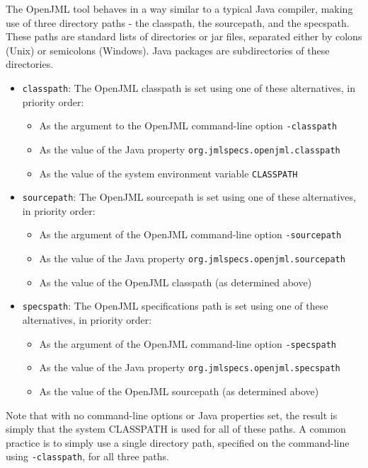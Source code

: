 The OpenJML tool behaves in a way similar to a typical Java compiler, 
making use of three directory paths - the classpath, the sourcepath, and the specspath.  
These paths are standard lists of directories or jar files, 
separated either by colons (Unix) or semicolons (Windows).  
Java packages are subdirectories of these directories.

\begin{itemize}[noitemsep,nolistsep]
\item \texttt{classpath}: The OpenJML classpath is set using one of these alternatives, in priority order:
\begin{itemize}[noitemsep,nolistsep]
\item As the argument to the OpenJML command-line option \texttt{-classpath}
\item As the value of the Java property \texttt{org.jmlspecs.openjml.classpath}
\item As the value of the system environment variable \texttt{CLASSPATH}
\end{itemize}
\item \texttt{sourcepath}: The OpenJML sourcepath is set using one of these alternatives, in priority order:
\begin{itemize}[noitemsep,nolistsep]
\item As the argument of the OpenJML command-line option \texttt{-sourcepath}
\item As the value of the Java property \texttt{org.jmlspecs.openjml.sourcepath}
\item As the value of the OpenJML classpath (as determined above)
\end{itemize}
\item \texttt{specspath}: The OpenJML specifications path is set using one of these alternatives, in priority order:
\begin{itemize}[noitemsep,nolistsep]
\item As the argument of the OpenJML command-line option \texttt{-specspath}
\item As the value of the Java property \texttt{org.jmlspecs.openjml.specspath}
\item As the value of the OpenJML sourcepath (as determined above)
\end{itemize}
\end{itemize}

Note that with no command-line options or Java properties set, the result is simply that the system CLASSPATH is used for all of these paths. A common practice is to simply use a single directory path, specified on the command-line using \texttt{-classpath}, for all three paths.

